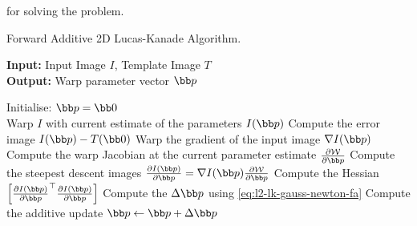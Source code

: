 for solving the problem.
\begin{algorithm}[t]
\caption{Forward Additive 2D Lucas-Kanade Algorithm.}
\label{alg:lk_2d_fa}
    {\textbf{Input:} Input Image $I$, Template Image $T$} \\
    {\textbf{Output:} Warp parameter vector $\p$}  \\
    \begin{algorithmic}[1]
        \State{}Initialise: $\p = \zero$\\
        \While{$\norm{\Delta \p} > \epsilon$} %
            \State{}Warp $I$ with current estimate of the parameters $I(\p)$
            \State{}Compute the error image $I(\p) - T(\zero)$
            \State{}Warp the gradient of the input image $\nabla I(\p)$
            \State{}Compute the warp Jacobian at the current parameter estimate $\frac{\partial \mathcal{W}}{\partial \p}$
            \State{}Compute the steepest descent images $\frac{\partial I(\p)}{\partial \p} = \nabla I(\p) \frac{\partial \mathcal{W}}{\partial \p}$
            \State{}Compute the Hessian $\left[ {\frac{\partial I(\p)}{\partial \p}}^{\top} \frac{\partial I(\p)}{\partial \p} \right]$
            \State{}Compute the $\Delta \p$ using \cref{eq:l2-lk-gauss-newton-fa}
            \State{}Compute the additive update $\p \leftarrow \p + \Delta \p$
        \EndWhile{}
    \end{algorithmic}
\end{algorithm}
